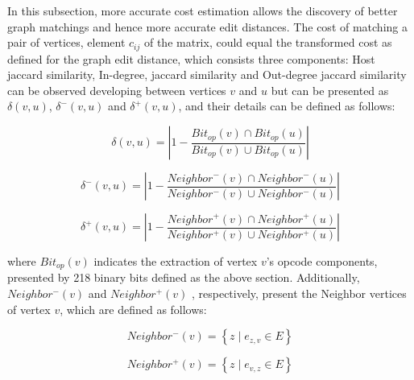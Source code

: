 In this subsection, more accurate cost estimation allows the discovery of better graph matchings and hence more accurate edit distances.  The cost of matching a pair of vertices, element $c_{ij}$ of the matrix, could equal the transformed cost as defined for the graph edit distance, which consists three components:  Host jaccard similarity, In-degree,  jaccard similarity and  Out-degree jaccard similarity can be observed developing between vertices $v$ and $u$ but can be presented as $\delta \left ( v, u \right )$, $\delta^{-} \left ( v, u \right )$ and $\delta^{+} \left ( v, u \right )$, and their details can be defined as follows: 

\begin{equation}
        \label{eq:hostop}
 \delta \left ( v, u \right ) = \left | 1 - \frac{Bit_{op}\left ( v \right ) \cap Bit_{op}\left ( u \right )}{Bit_{op}\left ( v \right ) \cup  Bit_{op}\left ( u \right )} \right |
  \end{equation}
 
 \begin{equation}
        \label{eq:inop}
\delta^{-} \left ( v, u \right ) = \left | 1 - \frac{Neighbor^{-}\left ( v \right ) \cap Neighbor^{-}\left ( u \right )}{Neighbor^{-}\left ( v \right ) \cup  Neighbor^{-}\left ( u \right )} \right |
 \end{equation}
 
 \begin{equation}
        \label{eq:outop}
\delta^{+} \left ( v, u \right ) = \left | 1 - \frac{Neighbor^{+}\left ( v \right ) \cap Neighbor^{+}\left ( u \right )}{Neighbor^{+}\left ( v \right ) \cup  Neighbor^{+}\left ( u \right )} \right |
 \end{equation}
  
 where $Bit_{op}\left ( v \right )$ indicates the extraction of vertex $v$'s opcode components, presented by 218 binary bits defined as the above section. Additionally, $Neighbor^{-}\left ( v \right )$ and $Neighbor^{+}\left ( v \right )$ , respectively, present the Neighbor vertices of vertex $v$, which are defined as follows:
 
 \begin{equation}
        \label{eq:indegree}
Neighbor^{-}\left ( v \right ) = \left \{ z \mid e_{z,v} \in E \right \}
  \end{equation}
  
  \begin{equation}
        \label{eq:outdegree}
 Neighbor^{+}\left ( v \right ) = \left \{ z \mid e_{v,z} \in E \right \}
  \end{equation}
   
